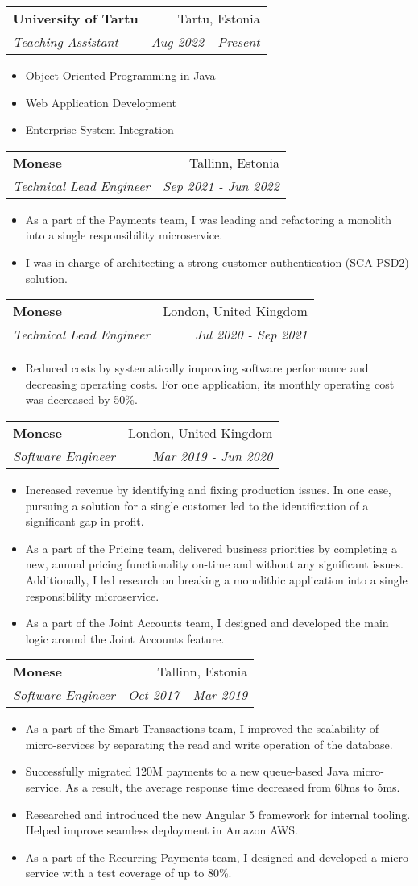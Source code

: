 \documentclass[11pt,a4paper,oneside]{report}
\makeatletter
\newcommand{\resumeItemWithoutTitle}[2]{
    \item\small{
        \textbf{#1}{#2\vspace{-2pt}}
    }
}
\newcommand{\resumeSubheading}[4]{
    \vspace{-1pt}\item
    \begin{tabular*}{0.97\textwidth}[t]{l@{\extracolsep{\fill}}r}
        \textbf{#1} & #2 \\
        \textit{\small#3} & \textit{\small #4} \\
    \end{tabular*}\vspace{-5pt}
}
\newcommand{\resumeSubSubheading}[2]{
    \begin{tabular*}{0.97\textwidth}{l@{\extracolsep{\fill}}r}
        \textit{\small#1} & \textit{\small #2} \\
    \end{tabular*}\vspace{-5pt}
}
\newcommand{\resumeItemListStart}{\begin{itemize}}
\newcommand{\resumeItemListEnd}{\end{itemize}\vspace{-5pt}}
\makeatother
\begin{document}
\resumeSubheading
{University of Tartu}{Tartu, Estonia}
{Teaching Assistant}{Aug 2022 - Present}
    \resumeItemListStart
        \resumeItemWithoutTitle{}
        {Object Oriented Programming in Java}
        \resumeItemWithoutTitle{}
        {Web Application Development}
        \resumeItemWithoutTitle{}
        {Enterprise System Integration}
        \resumeItemListEnd

\resumeSubheading
{Monese}{Tallinn, Estonia}
{Technical Lead Engineer}{Sep 2021 - Jun 2022}
  \resumeItemListStart
    \resumeItemWithoutTitle{}
    {As a part of the Payments team, I was leading and refactoring a monolith into a single responsibility microservice.}
    \resumeItemWithoutTitle{}
    {I was in charge of architecting a strong customer authentication (SCA PSD2) solution.}
  \resumeItemListEnd

\resumeSubheading
{Monese}{London, United Kingdom}
{Technical Lead Engineer}{Jul 2020 - Sep 2021}
    \resumeItemListStart
        \resumeItemWithoutTitle{}
        {Reduced costs by systematically improving software performance and decreasing operating costs. For one application, its monthly operating cost was decreased by 50\%.}
        \resumeItemListEnd

\resumeSubheading
{Monese}{London, United Kingdom}
{Software Engineer}{Mar 2019 - Jun 2020}
    \resumeItemListStart
        \resumeItemWithoutTitle{}
        {Increased revenue by identifying and fixing production issues. In one case, pursuing a solution for a single customer led to the identification of a significant gap in profit.}
        \resumeItemWithoutTitle{}
        {As a part of the Pricing team, delivered business priorities by completing a new, annual pricing functionality on-time and without any significant issues.
        Additionally, I led research on breaking a monolithic application into a single responsibility microservice.}
        \resumeItemWithoutTitle{}
        {As a part of the Joint Accounts team, I designed and developed the main logic around the Joint Accounts feature.}
        \resumeItemListEnd

\resumeSubheading
{Monese}{Tallinn, Estonia}
{Software Engineer}{Oct 2017 - Mar 2019}
  \resumeItemListStart
    \resumeItemWithoutTitle{}
    {As a part of the Smart Transactions team, I improved the scalability of micro-services by separating the read and write operation of the database.}
    \resumeItemWithoutTitle{}
    {Successfully migrated 120M payments to a new queue-based Java micro-service. As a result, the average response time decreased from 60ms to 5ms.}
    \resumeItemWithoutTitle{}
    {Researched and introduced the new Angular 5 framework for internal tooling. Helped improve seamless deployment in Amazon AWS.}
    \resumeItemWithoutTitle{}
    {As a part of the Recurring Payments team, I designed and developed a micro-service with a test coverage of up to 80\%.}
  \resumeItemListEnd
\end{document}
